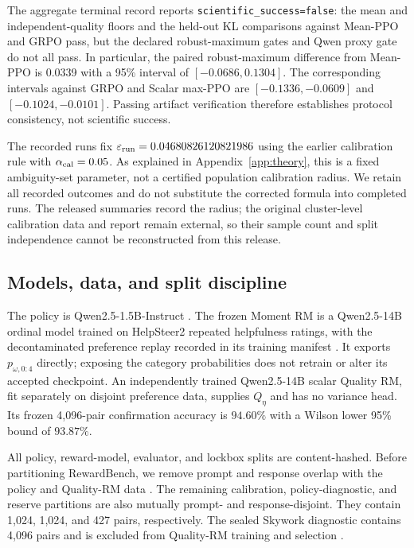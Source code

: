 The aggregate terminal record reports \texttt{scientific\_success=false}:
the mean and independent-quality floors and the held-out KL comparisons against
Mean-PPO and GRPO pass, but the declared robust-maximum gates and Qwen
proxy gate do not all pass. In particular, the paired robust-maximum difference
from Mean-PPO is 0.0339 with a 95\% interval of $[-0.0686,0.1304]$.
The corresponding intervals against GRPO and Scalar max-PPO are
$[-0.1336,-0.0609]$ and $[-0.1024,-0.0101]$. Passing artifact verification
therefore establishes protocol consistency, not scientific success.

The recorded runs fix \(\varepsilon_{\rm run}=0.04680826120821986\)
using the earlier calibration rule with \(\alpha_{\rm cal}=0.05\).
As explained in Appendix~\ref{app:theory}, this is a fixed ambiguity-set
parameter, not a certified population calibration radius. We retain all
recorded outcomes and do not substitute the corrected formula into completed
runs. The released summaries record the radius; the original cluster-level
calibration data and report remain external, so their sample count and split
independence cannot be reconstructed from this release.

\subsection{Models, data, and split discipline}
\label{subsec:models-data}

The policy is Qwen2.5-1.5B-Instruct
\citep{qwen2024qwen25}.  The frozen Moment RM is a Qwen2.5-14B ordinal
model trained on HelpSteer2 repeated helpfulness ratings, with the
decontaminated preference replay recorded in its training manifest
\citep{wang2024helpsteer2}.  It exports
\(p_{\omega,0:4}\) directly; exposing the category probabilities
does not retrain or alter its accepted checkpoint.  An independently trained
Qwen2.5-14B scalar Quality RM, fit separately on disjoint preference data,
supplies \(Q_\eta\) and has no
variance head.  Its frozen 4,096-pair confirmation accuracy is
\(94.60\%\) with a Wilson lower 95\% bound of
\(93.87\%\).

All policy, reward-model, evaluator, and lockbox splits are content-hashed.
Before partitioning RewardBench, we remove prompt and response overlap with
the policy and Quality-RM data \citep{lambert2024rewardbench}.  The remaining
calibration, policy-diagnostic, and reserve partitions are also mutually
prompt- and response-disjoint.  They contain 1,024, 1,024, and 427 pairs,
respectively.  The sealed Skywork diagnostic contains 4,096 pairs and is
excluded from Quality-RM training and selection
\citep{liu2024skyworkreward}.

